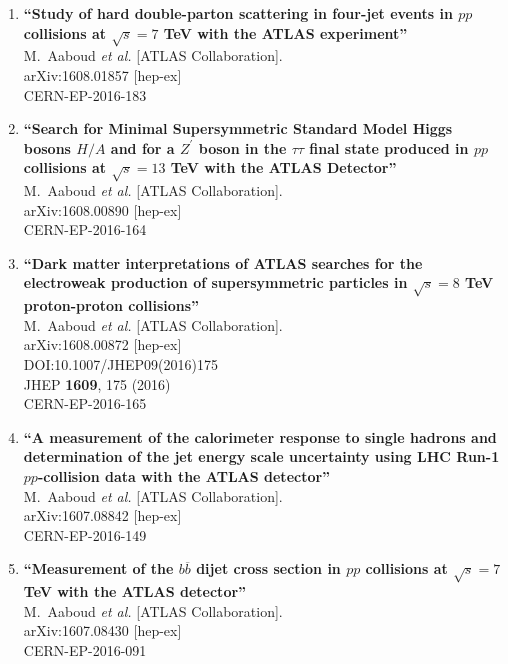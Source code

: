 \documentclass{article}
\begin{document}
\begin{enumerate}
\item%
{\bf ``Study of hard double-parton scattering in four-jet events in $pp$ collisions at $\sqrt{s} = 7$ TeV with the ATLAS experiment''}
  \\{}M.~Aaboud {\it et al.} [ATLAS Collaboration].
  \\{}arXiv:1608.01857 [hep-ex]
  \\{}CERN-EP-2016-183
\item%
{\bf ``Search for Minimal Supersymmetric Standard Model Higgs bosons $H/A$ and for a $Z^{\prime}$ boson in the $\tau \tau$ final state produced in $pp$ collisions at $\sqrt{s}=13$ TeV with the ATLAS Detector''}
  \\{}M.~Aaboud {\it et al.} [ATLAS Collaboration].
  \\{}arXiv:1608.00890 [hep-ex]
  \\{}CERN-EP-2016-164
\item%
{\bf ``Dark matter interpretations of ATLAS searches for the electroweak production of supersymmetric particles in $ \sqrt{s}=8 $ TeV proton-proton collisions''}
  \\{}M.~Aaboud {\it et al.} [ATLAS Collaboration].
  \\{}arXiv:1608.00872 [hep-ex]
  \\{}DOI:10.1007/JHEP09(2016)175
  \\{}JHEP {\bf 1609}, 175 (2016)
  \\{}CERN-EP-2016-165
\item%
{\bf ``A measurement of the calorimeter response to single hadrons and determination of the jet energy scale uncertainty using LHC Run-1 $pp$-collision data with the ATLAS detector''}
  \\{}M.~Aaboud {\it et al.} [ATLAS Collaboration].
  \\{}arXiv:1607.08842 [hep-ex]
  \\{}CERN-EP-2016-149

\item%
{\bf ``Measurement of the $b\overline{b}$ dijet cross section in $pp$ collisions at $\sqrt{s} = 7$ TeV with the ATLAS detector''}
  \\{}M.~Aaboud {\it et al.} [ATLAS Collaboration].
  \\{}arXiv:1607.08430 [hep-ex]
  \\{}CERN-EP-2016-091


\end{enumerate}
\end{document}
